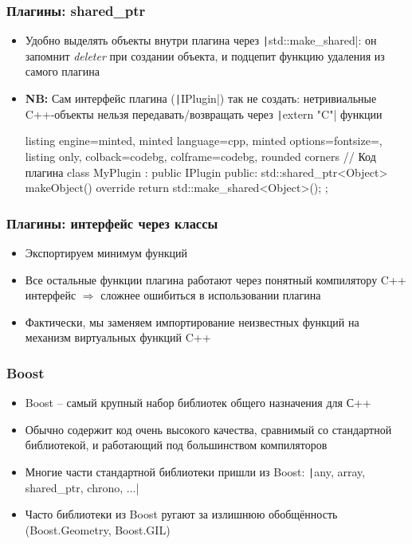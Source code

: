 \documentclass[10pt]{beamer}
\begin{document}
\begin{frame}[fragile]
\frametitle{Плагины: shared\_ptr}
\begin{itemize}
\item Удобно выделять объекты внутри плагина через \texttt|std::make_shared|: он запомнит \textit{deleter} при создании объекта, и подцепит функцию удаления из самого плагина
\pause
\item \textbf{NB:} Сам интерфейс плагина (\texttt|IPlugin|) так не создать: нетривиальные C++-объекты нельзя передавать/возвращать через \texttt|extern "C"| функции
\pause
{}
\begin{tcblisting}{listing engine=minted, minted language=cpp, minted options={fontsize=\scriptsize}, listing only, colback=codebg, colframe=codebg, rounded corners}
// Код плагина
class MyPlugin : public IPlugin {
public:
  std::shared_ptr<Object> makeObject() override {
    return std::make_shared<Object>();
  }
};
\end{tcblisting}
\end{itemize}
\end{frame}

\begin{frame}[fragile]
\frametitle{Плагины: интерфейс через классы}
\begin{itemize}
\item Экспортируем минимум функций
\pause
\item Все остальные функции плагина работают через понятный компилятору C++ интерфейс \begin{math}\Longrightarrow\end{math} сложнее ошибиться в использовании плагина
\pause
\item Фактически, мы заменяем импортирование неизвестных функций на механизм виртуальных функций C++
\end{itemize}
\end{frame}

\begin{frame}[fragile]
\frametitle{Boost}
\begin{itemize}
\item Boost -- самый крупный набор библиотек общего назначения для С++
\pause
\item Обычно содержит код очень высокого качества, сравнимый со стандартной библиотекой, и работающий под большинством компиляторов
\pause
\item Многие части стандартной библиотеки пришли из Boost: \texttt|any, array, shared_ptr, chrono, ...|
\pause
\item Часто библиотеки из Boost ругают за излишнюю обобщённость (Boost.Geometry, Boost.GIL)
\end{itemize}
\end{frame}
\end{document}
